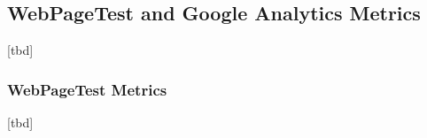 
\subsection{WebPageTest and Google Analytics Metrics}

[tbd]





\subsubsection{WebPageTest Metrics}

[tbd]













	









